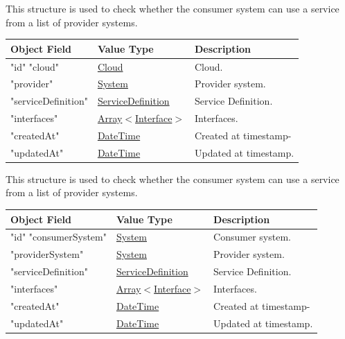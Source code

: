 \documentclass[a4paper]{arrowhead}
\newcommand{\mref}[1]{{\textcolor{ArrowheadPurple}{\hyperref[sec:model:#1]{#1}}}}
\newcommand{\pref}[1]{{\textcolor{ArrowheadGrey}{\hyperref[sec:model:primitives:#1]{#1}}}}
\begin{document}

This structure is used to check whether the consumer system can use a service from a list of provider systems.

\begin{table}[ht!]
\begin{tabularx}{\textwidth}{| p{5cm} | p{5cm} | X |} \hline
\rowcolor{gray!33} Object Field & Value Type      & Description \\ \hline
"id"
"cloud"              & \pref{Cloud}                        & Cloud. \\ \hline
"provider"           & \pref{System}                     & Provider system. \\ \hline
"serviceDefinition"  & \pref{ServiceDefinition}            & Service Definition. \\ \hline
"interfaces"         & \pref{Array}$<$\mref{Interface}$>$  & Interfaces. \\ \hline
"createdAt"          & \pref{DateTime}                     & Created at timestamp- \\ \hline
"updatedAt"          & \pref{DateTime}                     & Updated at timestamp. \\ \hline

\end{tabularx}
\end{table}


This structure is used to check whether the consumer system can use a service from a list of provider systems.

\begin{table}[ht!]
\begin{tabularx}{\textwidth}{| p{5cm} | p{5cm} | X |} \hline
\rowcolor{gray!33} Object Field & Value Type      & Description \\ \hline
"id"
"consumerSystem"     & \pref{System}                     & Consumer system. \\ \hline
"providerSystem"     & \pref{System}                     & Provider system. \\ \hline
"serviceDefinition"  & \pref{ServiceDefinition}            & Service Definition. \\ \hline
"interfaces"         & \pref{Array}$<$\mref{Interface}$>$  & Interfaces. \\ \hline
"createdAt"          & \pref{DateTime}                     & Created at timestamp- \\ \hline
"updatedAt"          & \pref{DateTime}                     & Updated at timestamp. \\ \hline

\end{tabularx}
\end{table}
\end{document}

